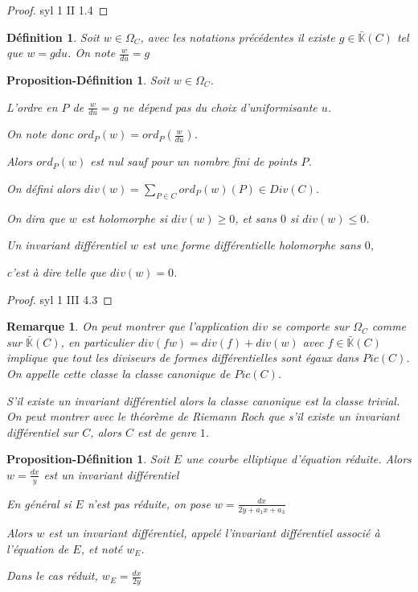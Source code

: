 \documentclass{article}
\newcommand{\K}[0]{\mathbb{K}}
\newcommand{\Kb}[0]{\bar{\K}}
\newtheorem{Prod}[The]{Proposition-Définition}
\newtheorem{Def}[The]{Définition}
\newtheorem{Rem}[The]{Remarque}
\begin{document}
\begin{proof}
	syl 1 II 1.4
\end{proof}

\begin{Def}
	Soit $w\in\Omega_{C}$, avec les notations précédentes il existe $g\in\Kb(C)$ tel que $w = gdu$. On note $\frac{w}{du} = g$
\end{Def}

\begin{Prod}
	Soit $w\in\Omega_{C}$. 
	
	L'ordre en $P$ de $\frac{w}{du} = g$ ne dépend pas du choix d'uniformisante $u$. 
	
	On note donc $ord_{P}(w) = ord_{P}(\frac{w}{du})$. 
	
	Alors $ord_{P}(w)$ est nul sauf pour un nombre fini de points $P$.
	
	On défini alors $div(w) = \sum_{P\in C} ord_{P}(w)(P) \in Div(C)$.
	
	On dira que $w$ est holomorphe si $div(w)\geq 0$, et sans $0$ si $div(w)\leq 0$.
	
	Un invariant différentiel $w$ est une forme différentielle holomorphe sans $0$, 
	
	c'est à dire telle que $div(w) = 0$.
\end{Prod}

\begin{proof}
	syl 1 III 4.3
\end{proof}

\begin{Rem}
	On peut montrer que l'application $div$ se comporte sur $\Omega_{C}$ comme sur $\Kb(C)$, en particulier $div(fw) = div(f) + div(w)$ avec $f\in\Kb(C)$ implique que tout les diviseurs de formes différentielles sont égaux dans $Pic(C)$. On appelle cette classe la classe canonique de $Pic(C)$. 
	
	S'il existe un invariant différentiel alors la classe canonique est la classe trivial. On peut montrer avec le théorème de Riemann Roch que s'il existe un invariant différentiel sur $C$, alors $C$ est de genre $1$.
\end{Rem}

\begin{Prod}
	Soit $E$ une courbe elliptique d'équation réduite. Alors $w = \frac{dx}{y}$ est un invariant différentiel
	
	En général si $E$ n'est pas réduite, on pose $w = \frac{dx}{2y + a_{1}x + a_{3}}$
	
	Alors $w$ est un invariant différentiel, appelé l'invariant différentiel associé à l'équation de $E$, et noté $w_E$.
	
	Dans le cas réduit, $w_E = \frac{dx}{2y} $
\end{Prod}
\end{document}
